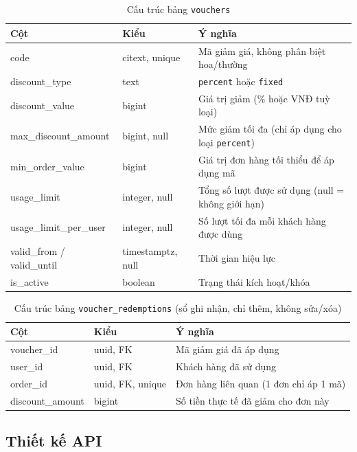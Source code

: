 \documentclass[12pt,a4paper]{article}
\begin{document}
\begin{table}[H]
\centering
\small
\begin{tabular}{@{}p{4.1cm}p{2.6cm}p{6.4cm}@{}}
\toprule
\textbf{Cột} & \textbf{Kiểu} & \textbf{Ý nghĩa} \\
\midrule
code & citext, unique & Mã giảm giá, không phân biệt hoa/thường \\
discount\_type & text & \texttt{percent} hoặc \texttt{fixed} \\
discount\_value & bigint & Giá trị giảm (\% hoặc VNĐ tuỳ loại) \\
max\_discount\_amount & bigint, null & Mức giảm tối đa (chỉ áp dụng cho loại \texttt{percent}) \\
min\_order\_value & bigint & Giá trị đơn hàng tối thiểu để áp dụng mã \\
usage\_limit & integer, null & Tổng số lượt được sử dụng (null = không giới hạn) \\
usage\_limit\_per\_user & integer, null & Số lượt tối đa mỗi khách hàng được dùng \\
valid\_from / valid\_until & timestamptz, null & Thời gian hiệu lực \\
is\_active & boolean & Trạng thái kích hoạt/khóa \\
\bottomrule
\end{tabular}
\caption{Cấu trúc bảng \texttt{vouchers}}
\end{table}

\begin{table}[H]
\centering
\small
\begin{tabular}{@{}p{4.1cm}p{2.6cm}p{6.4cm}@{}}
\toprule
\textbf{Cột} & \textbf{Kiểu} & \textbf{Ý nghĩa} \\
\midrule
voucher\_id & uuid, FK & Mã giảm giá đã áp dụng \\
user\_id & uuid, FK & Khách hàng đã sử dụng \\
order\_id & uuid, FK, unique & Đơn hàng liên quan (1 đơn chỉ áp 1 mã) \\
discount\_amount & bigint & Số tiền thực tế đã giảm cho đơn này \\
\bottomrule
\end{tabular}
\caption{Cấu trúc bảng \texttt{voucher\_redemptions} (sổ ghi nhận, chỉ thêm, không sửa/xóa)}
\end{table}

\subsection{Thiết kế API}
\end{document}
